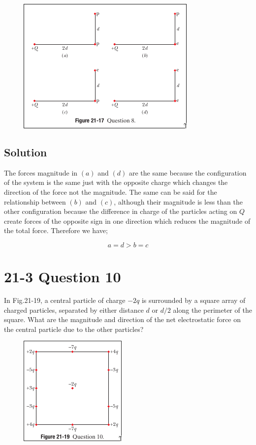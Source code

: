 \documentclass{article}
\begin{document}
\begin{figure}[ht]
    \centering
    \includegraphics[scale=0.75]{image-2.png}
\end{figure}

\subsection*{Solution}
The forces magnitude in $(a)$ and $(d)$ are the same because the configuration of the system is the same just with the opposite charge which changes the direction of the force not the magnitude.
The same can be said for the relationship between $(b)$ and $(c)$, although their magnitude is less than the other configuration because the difference in charge of the particles acting on $Q$ create forces of the opposite sign in one direction which reduces the magnitude of the total force.
Therefore we have;

\[
    \boxed{a = d > b = c}
\]

\section*{21-3 Question 10}
In Fig.21-19, a central particle of charge $-2q$ is surrounded by a square array of charged particles, separated by either distance $d$ or $d/2$ along the perimeter of the square.
What are the magnitude and direction of the net electrostatic force on the central particle due to the other particles?

\begin{figure}[ht]
    \centering
    \includegraphics[scale=0.75]{image-3.png}
\end{figure}
\end{document}
